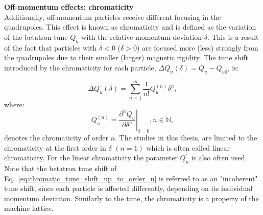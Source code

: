 

\textbf{Off-momentum effects: chromaticity}\\
Additionally, off-momentum particles receive different focusing in the quadrupoles. This effect is known as chromaticity and is defined as the variation of the betatron tune $Q_u$ with the relative momentum deviation $\delta$. This is a result of the fact that particles with $\delta < 0$ ($\delta > 0$) are focused more (less) strongly from the quadrupoles due to their smaller (larger) magnetic rigidity. The tune shift introduced by the chromaticity for each particle, $ \Delta Q_u (\delta)= Q_u - Q_{u0}$, is: %

\begin{equation}\label{eq:chromatic_tune_shift_up_to_order_n}
   \Delta Q_u (\delta) = \sum_{n=1}^m \frac{1}{n!} Q_u^{(n)} \delta^n, 
\end{equation}
where: %
\begin{equation}\label{eq:chroma_up_to_order_m}
    Q_u^{(n)} = \left. \frac{\partial ^n Q_u}{\partial \delta^n} \right|_{\delta=0}, n \in \mathbb{N},
 \end{equation}
denotes the chromaticity of order $n$. The studies in this thesis, are limited to the chromaticity at the first order in $\delta$ $(n=1)$ which is often called linear chromaticity. For the linear chromaticity the parameter $Q_u^\prime$ is also often used. Note that the betatron tune shift of Eq.~\eqref{eq:chromatic_tune_shift_up_to_order_n} is referred to as an "incoherent" tune shift, since each particle is affected differently, depending on its individual momentum deviation. Similarly to the tune, the chromaticity is a property of the machine lattice. %


